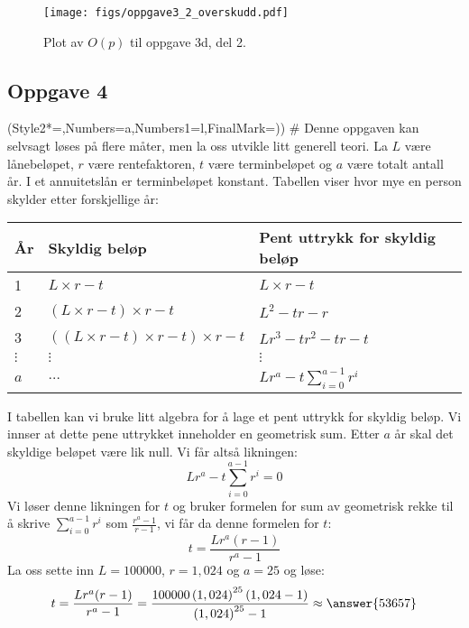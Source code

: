 \begin{easylist}[enumerate]
	\begin{figure}[th!]
		\centering
		\texttt{[image: figs/oppgave3\_2\_overskudd.pdf]}
		\caption{Plot av $O(p)$ til oppgave 3d, del 2.}
		\label{fig:oppgave3_3}
	\end{figure}
\end{easylist}

\subsection*{Oppgave 4}
\begin{easylist}[enumerate]
	\ListProperties(Style2*=,Numbers=a,Numbers1=l,FinalMark={)})
	# Denne oppgaven kan selvsagt løses på flere måter, men la oss utvikle litt generell teori.
	La $L$ være lånebeløpet, $r$ være rentefaktoren, $t$ være terminbeløpet og $a$ være totalt antall år.
	I et annuitetslån er terminbeløpet konstant. Tabellen viser hvor mye
	en person skylder etter forskjellige år:
	\begin{center}
		\begin{tabular}{l|l|l}
			\textbf{År} & \textbf{Skyldig beløp} & \textbf{Pent uttrykk for skyldig beløp} \\ \hline
			1 & $L\times r - t$ & $L\times r - t$ \\
			2 & $\left(L\times r - t\right) \times r - t$ & $L^2 - tr -r$ \\
			3 & $\left( \left(L\times r - t\right) \times r - t  \right) \times r - t$ & $Lr^3 - tr^2 - tr - t$ \\
			$\vdots$ & $\vdots$ & $\vdots$ \\
			$a$ & $\dots$ & $Lr^a - t \sum_{i=0}^{a-1} r^i$ 
		\end{tabular}
	\end{center}
	I tabellen kan vi bruke litt algebra for å lage et pent uttrykk for skyldig beløp.
	Vi innser at dette pene uttrykket inneholder en geometrisk sum. 
	Etter $a$ år skal det skyldige beløpet være lik null. Vi får altså likningen:
	\begin{equation*}
	Lr^a - t \sum_{i=0}^{a-1} r^i = 0
	\end{equation*}
	Vi løser denne likningen for $t$ og bruker formelen for sum av geometrisk rekke til å skrive $\sum_{i=0}^{a-1} r^i$ som $ \frac{r^a-1}{r-1}$, vi får da denne formelen for $t$:
	\begin{equation}
	\label{renteformel}
	t = \frac{Lr^a(r-1)}{r^a-1}
	\end{equation}
	La oss sette inn $L = 100000$, $r = 1,024$ og $a = 25$ og løse:
	\begin{equation*}
	t = \frac{Lr^a(r-1)}{r^a-1} = \frac{100000\left(1,024\right)^{25}(1,024-1)}{\left(1,024\right)^{25}-1} \approx \answer{53657}
	\end{equation*}
	

\end{easylist}
